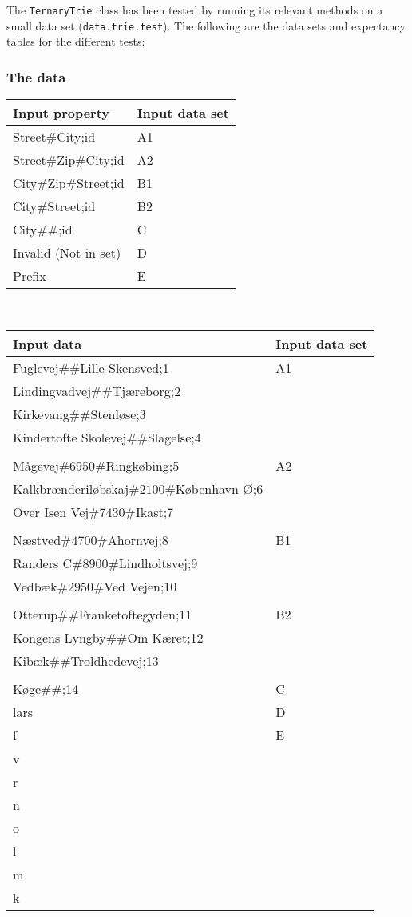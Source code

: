 The \texttt{TernaryTrie} class has been tested by running its relevant methods on a small data set (\texttt{data.trie.test}). The following are the data sets and expectancy tables for the different tests:

\subsubsection{The data}
\begin{tabular}{ p{8cm} | p{2cm} }
	\textbf{Input property} & \textbf{Input data set} \\	
	\hline
	Street$\#$City;id & A1 \\
	Street$\#$Zip$\#$City;id & A2 \\
	City$\#$Zip$\#$Street;id & B1 \\
	City$\#$Street;id &  B2 \\
	City$\#\#$;id & C \\
	Invalid (Not in set) & D \\
	Prefix & E \\
\end{tabular}
\\
\begin{tabular}{ p{8cm} | p{2cm} }
\textbf{Input data} & \textbf{Input data set} \\
	\hline
	Fuglevej$\#\#$Lille Skensved;1 & A1 \\
	Lindingvadvej$\#\#$Tj\ae reborg;2 \\
	Kirkevang$\#\#$Stenl\o se;3 \\
	Kindertofte Skolevej$\#\#$Slagelse;4 \\
	\\
	M\aa gevej$\#6950\#$Ringk\o bing;5 & A2 \\
	Kalkbr\ae nderil\o bskaj$\#2100\#$K\o benhavn \O ;6 \\
	Over Isen Vej$\#7430\#$Ikast;7 \\
	\\
	N\ae stved$\#4700\#$Ahornvej;8 & B1 \\
	Randers C$\#8900\#$Lindholtsvej;9 \\
	Vedb\ae k$\#2950\#$Ved Vejen;10 \\
	\\
	Otterup$\#\#$Franketoftegyden;11 & B2 \\
	Kongens Lyngby$\#\#$Om K\ae ret;12 \\
	Kib\ae k$\#\#$Troldhedevej;13 \\
	\\
	K\o ge$\#\#$;14 & C \\
	lars & D \\
	f & E \\
	v &   \\
	r &   \\
	n &   \\
	o &   \\
	l &   \\
	m &   \\
	k &   \\
\end{tabular}

